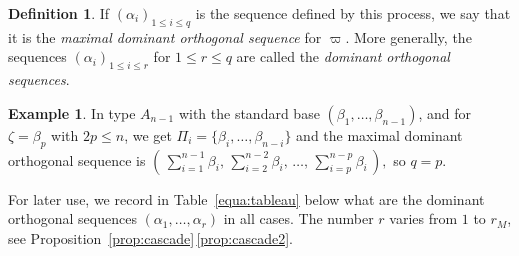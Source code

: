 \documentclass[10pt]{amsart}
\theoremstyle{plain}
\theoremstyle{definition}
\newtheorem{defi}[theo]{Definition}
\newtheorem{exem}[theo]{Example}
\begin{document}
\begin{defi}
\label{def:cascade}
If $(\alpha_i)_{1 \leq i \leq q}$ is the sequence defined by this process,
we say that it is the \emph{maximal dominant orthogonal sequence} for $\varpi$. More generally,
the sequences $(\alpha_i)_{1 \leq i \leq r}$ for $1\leq
r\leq q$ are called the \emph{dominant orthogonal sequences}.
\end{defi}

\begin{exem}
\label{exem:cascade}
In type $A_{n-1}$ with the standard base $(\beta_1,\ldots,\beta_{n-1})$,
and for
$\zeta=\beta_p$ with $2p\leq n$, we get $\Pi_i=\{\beta_i,\ldots,\beta_{n-i}\}$ and the maximal
dominant orthogonal sequence is
$(\, \sum_{i=1}^{n-1}\beta_i, \, \sum_{i=2}^{n-2}\beta_i,\, \ldots, \, \sum_{i=p}^{n-p}\beta_i
\,),$ so $q=p$.
\end{exem}

For later use, we record in Table~\ref{equa:tableau} below what are
the dominant orthogonal sequences $(\alpha_1,\ldots,\alpha_r)$ in all cases. The number $r$ varies from
$1$ to $r_M$, see Proposition~\ref{prop:cascade}\,\eqref{prop:cascade2}.
\end{document}
